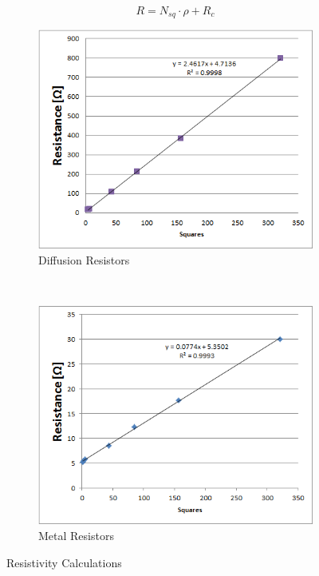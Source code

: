 \documentclass[letter,12pt]{article}
\begin{document}
		\begin{equation}
			R = N_{sq} \cdot \rho + R_c
			\label{eq:Resistance}
		\end{equation}
	
		\begin{figure}[]
			\centering
			\begin{subfigure}[b]{.45\textwidth}
				\includegraphics[width=\textwidth]{./Images/R_Diffusion_Calculations.png}
				\caption{Diffusion Resistors}
				\label{fig:R_Diffusion_Calculations}
			\end{subfigure}
			~
			\begin{subfigure}[b]{.45\textwidth}
				\includegraphics[width=\textwidth]{./Images/R_Metal_Calculations.png}
				\caption{Metal Resistors}
				\label{fig:R_Metal_Calculations}
			\end{subfigure}
			
			\caption{Resistivity Calculations}
			\label{fig:R_Calculations}
		\end{figure}
	
\end{document}
